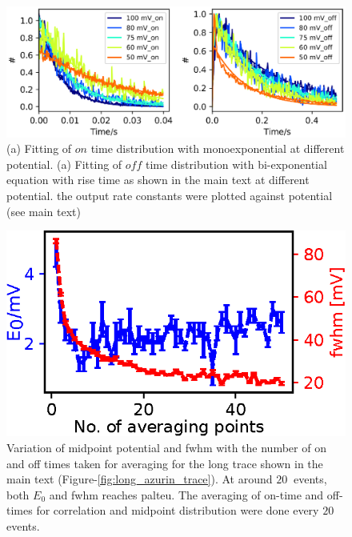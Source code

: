 \documentclass[11pt,a4paper,onecolumn]{article}
\begin{document}
\begin{figure}
  \centering
  \includegraphics{rate_fit_all_potential.eps}
  \makeatletter
  \renewcommand{\fnum@figure}{\figurename~S\thefigure}
  \makeatother
  \caption{(a) Fitting of $on$ time distribution with monoexponential at different potential. (a) Fitting of $off$ time distribution with bi-exponential equation with rise time as shown in the main text at different potential. the output rate constants were plotted against potential (see main text)}
  \label{SIfig: rate_fit_all_potential}
\end{figure}
\begin{figure}
  \centering
  \includegraphics[scale=1.5]{N_avgpoints_vs_fwhmwidth.eps}
  \makeatletter
  \renewcommand{\fnum@figure}{\figurename~S\thefigure}
  \makeatother
  \caption{Variation of midpoint potential and fwhm with the number of on and off times taken for averaging for the long trace shown in the main text (Figure-\ref{fig:long_azurin_trace}). At around $20~$ events, both $E_0$ and fwhm reaches palteu. The averaging of on-time and off-times for correlation and midpoint distribution were done every $20$ events.}
  \label{SIfig: N_avgpoints_vs_fwhmwidth}
\end{figure}
% 
\end{document}
